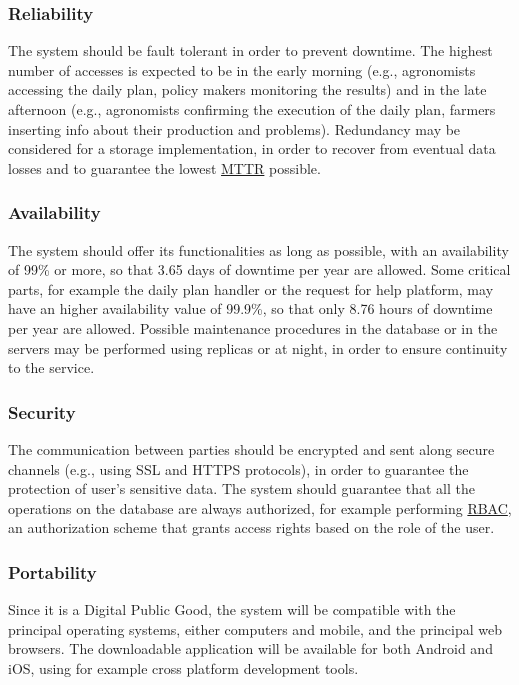 \subsubsection{Reliability}
The system should be fault tolerant in order to prevent downtime. The highest number of accesses is expected to be in the early morning (e.g., agronomists accessing the daily plan, policy makers monitoring the results) and in the late afternoon (e.g., agronomists confirming the execution of the daily plan, farmers inserting info about their production and problems).
\newline
Redundancy may be considered for a storage implementation, in order to recover from eventual data losses and to guarantee the lowest \hyperref[tab:acronymsTable]{MTTR} possible.
\subsubsection{Availability}
The system should offer its functionalities as long as possible, with an availability of 99\% or more, so that 3.65 days of downtime per year are allowed. Some critical parts, for example the daily plan handler or the request for help platform, may have an higher availability value of 99.9\%, so that only 8.76 hours of downtime per year are allowed. 
\newline
Possible maintenance procedures in the database or in the servers may be performed using replicas or at night, in order to ensure continuity to the service.
\subsubsection{Security}
The communication between parties should be encrypted and sent along secure channels (e.g., using SSL and HTTPS protocols), in order to guarantee the protection of user’s sensitive data. 
\newline
The system should guarantee that all the operations on the database are always authorized, for example performing \hyperref[tab:acronymsTable]{RBAC}, an authorization scheme that grants access rights based on the role of the user.
\subsubsection{Portability}
Since it is a Digital Public Good, the system will be compatible with the principal operating systems, either computers and mobile, and the principal web browsers. The downloadable application will be available for both Android and iOS, using for example cross platform development tools.

